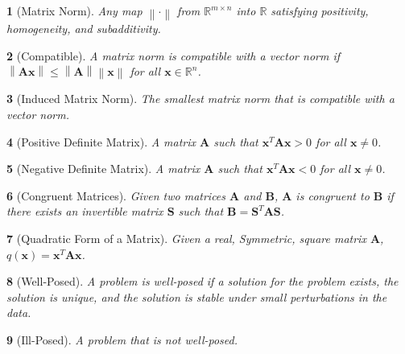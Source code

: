 \documentclass{article}
\theoremstyle{bolddef}
\newtheorem*{definition}{}
\begin{document}
\begin{definition}[Matrix Norm]
    Any map $\left\lVert \cdot \right\rVert$
    from $\mathbb{R}^{m \times n}$ into $\mathbb{R}$ satisfying positivity, homogeneity, and subadditivity.
\end{definition}

\begin{definition}[Compatible]
    A matrix norm is compatible with a vector norm if 
    $\left\lVert \mathbf{A} \mathbf{x} \right\rVert \leq \left\lVert \mathbf{A} \right\rVert \left\lVert \mathbf{x} \right\rVert$
    for all $\mathbf{x} \in \mathbb{R}^n$.
\end{definition}

\begin{definition}[Induced Matrix Norm]
    The smallest matrix norm that is compatible with a vector norm.
\end{definition}

\begin{definition}[Positive Definite Matrix]
    A matrix $\mathbf{A}$ such that $\mathbf{x}^{T} \mathbf{A} \mathbf{x} > 0$ for all $\mathbf{x} \neq 0$.
\end{definition}

\begin{definition}[Negative Definite Matrix]
    A matrix $\mathbf{A}$ such that $\mathbf{x}^{T} \mathbf{A} \mathbf{x} < 0$ for all $\mathbf{x} \neq 0$.
\end{definition}

\begin{definition}[Congruent Matrices]
    Given two matrices $\mathbf{A}$ and $\mathbf{B}$, $\mathbf{A}$ is congruent
    to $\mathbf{B}$ if there exists an invertible matrix $\mathbf{S}$
    such that $\mathbf{B} = \mathbf{S}^{T} \mathbf{A}\mathbf{S}$.
\end{definition}

\begin{definition}[Quadratic Form of a Matrix]
    Given a real, Symmetric, square matrix $\mathbf{A}$, $q(\mathbf{x}) = \mathbf{x}^{T} \mathbf{A} \mathbf{x}$.
\end{definition}

\begin{definition}[Well-Posed]
    A problem is well-posed if a solution for the problem exists, the solution
    is unique, and the solution is stable under small perturbations in the data.
\end{definition}

\begin{definition}[Ill-Posed]
    A problem that is not well-posed.
\end{definition}
\end{document}
